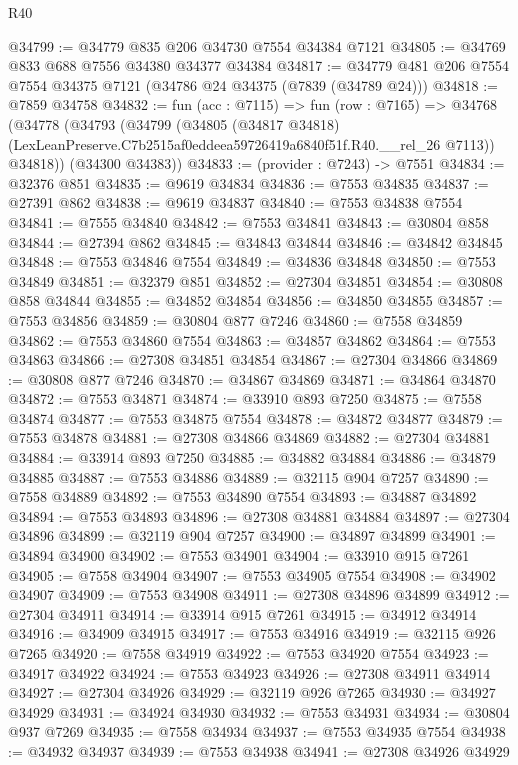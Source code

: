 \begin{lexlean}{R40}
\begin{coremodule}
@34799 := @34779 @835 @206 @34730 @7554 @34384 @7121
@34805 := @34769 @833 @688 @7556 @34380 @34377 @34384
@34817 := @34779 @481 @206 @7554 @7554 @34375 @7121 (@34786 @24 @34375 (@7839 (@34789 @24)))
@34818 := @7859 @34758
@34832 := fun (acc : @7115) =>
  fun (row : @7165) =>
  @34768
    (@34778
      (@34793
        (@34799
          (@34805
            (@34817 @34818)
            (LexLeanPreserve.C7b2515af0eddeea59726419a6840f51f.R40.__rel_26 @7113))
          @34818))
      (@34300 @34383))
@34833 := (provider : @7243) -> @7551
@34834 := @32376 @851
@34835 := @9619 @34834
@34836 := @7553 @34835
@34837 := @27391 @862
@34838 := @9619 @34837
@34840 := @7553 @34838 @7554
@34841 := @7555 @34840
@34842 := @7553 @34841
@34843 := @30804 @858
@34844 := @27394 @862
@34845 := @34843 @34844
@34846 := @34842 @34845
@34848 := @7553 @34846 @7554
@34849 := @34836 @34848
@34850 := @7553 @34849
@34851 := @32379 @851
@34852 := @27304 @34851
@34854 := @30808 @858 @34844
@34855 := @34852 @34854
@34856 := @34850 @34855
@34857 := @7553 @34856
@34859 := @30804 @877 @7246
@34860 := @7558 @34859
@34862 := @7553 @34860 @7554
@34863 := @34857 @34862
@34864 := @7553 @34863
@34866 := @27308 @34851 @34854
@34867 := @27304 @34866
@34869 := @30808 @877 @7246
@34870 := @34867 @34869
@34871 := @34864 @34870
@34872 := @7553 @34871
@34874 := @33910 @893 @7250
@34875 := @7558 @34874
@34877 := @7553 @34875 @7554
@34878 := @34872 @34877
@34879 := @7553 @34878
@34881 := @27308 @34866 @34869
@34882 := @27304 @34881
@34884 := @33914 @893 @7250
@34885 := @34882 @34884
@34886 := @34879 @34885
@34887 := @7553 @34886
@34889 := @32115 @904 @7257
@34890 := @7558 @34889
@34892 := @7553 @34890 @7554
@34893 := @34887 @34892
@34894 := @7553 @34893
@34896 := @27308 @34881 @34884
@34897 := @27304 @34896
@34899 := @32119 @904 @7257
@34900 := @34897 @34899
@34901 := @34894 @34900
@34902 := @7553 @34901
@34904 := @33910 @915 @7261
@34905 := @7558 @34904
@34907 := @7553 @34905 @7554
@34908 := @34902 @34907
@34909 := @7553 @34908
@34911 := @27308 @34896 @34899
@34912 := @27304 @34911
@34914 := @33914 @915 @7261
@34915 := @34912 @34914
@34916 := @34909 @34915
@34917 := @7553 @34916
@34919 := @32115 @926 @7265
@34920 := @7558 @34919
@34922 := @7553 @34920 @7554
@34923 := @34917 @34922
@34924 := @7553 @34923
@34926 := @27308 @34911 @34914
@34927 := @27304 @34926
@34929 := @32119 @926 @7265
@34930 := @34927 @34929
@34931 := @34924 @34930
@34932 := @7553 @34931
@34934 := @30804 @937 @7269
@34935 := @7558 @34934
@34937 := @7553 @34935 @7554
@34938 := @34932 @34937
@34939 := @7553 @34938
@34941 := @27308 @34926 @34929

\end{coremodule}
\end{lexlean}
